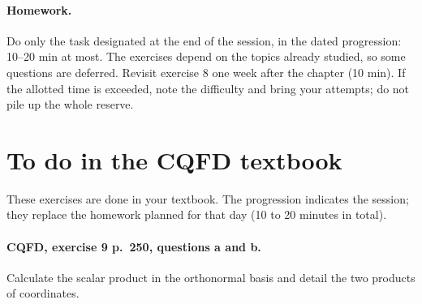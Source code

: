 \paragraph{Homework.} Do only the task designated at the end of the session, in the dated progression: 10--20 min at most. The exercises depend on the topics already studied, so some questions are deferred. Revisit exercise 8 one week after the chapter (10 min). If the allotted time is exceeded, note the difficulty and bring your attempts; do not pile up the whole reserve.
\endgroup
{}\section*{To do in the CQFD textbook}
These exercises are done in your textbook. The progression indicates the session; they replace the homework planned for that day (10 to 20 minutes in total).
\paragraph{CQFD, exercise 9 p.~250, questions a and b.}\label{C03-M1} Calculate the scalar product in the orthonormal basis and detail the two products of coordinates.
